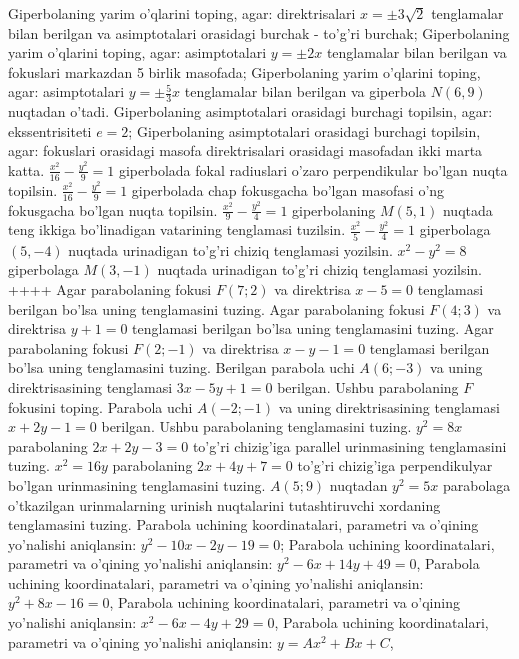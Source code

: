 Giperbolaning yarim o'qlarini toping, agar: direktrisalari $x= \pm 3 \sqrt{2}$ tenglamalar bilan berilgan va asimptotalari orasidagi burchak - to'g'ri burchak;
Giperbolaning yarim o'qlarini toping, agar: asimptotalari $y= \pm 2 x$ tenglamalar bilan berilgan va fokuslari markazdan 5 birlik masofada;
Giperbolaning yarim o'qlarini toping, agar: asimptotalari $y= \pm \frac{5}{3} x$ tenglamalar bilan berilgan va giperbola $N(6,9)$ nuqtadan o'tadi.
Giperbolaning asimptotalari orasidagi burchagi topilsin, agar: ekssentrisiteti $e=2$;
Giperbolaning asimptotalari orasidagi burchagi topilsin, agar: fokuslari orasidagi masofa direktrisalari orasidagi masofadan ikki marta katta.
$\frac{x^2}{16}-\frac{y^2}{9}=1$ giperbolada fokal radiuslari o'zaro perpendikular bo'lgan nuqta topilsin.
$\frac{x^2}{16}-\frac{y^2}{9}=1$ giperbolada chap fokusgacha bo'lgan masofasi o'ng fokusgacha bo'lgan nuqta topilsin.
$\frac{x^2}{9}-\frac{y^2}{4}=1$ giperbolaning $M(5,1)$ nuqtada teng ikkiga bo'linadigan vatarining tenglamasi tuzilsin.
$\frac{x^2}{5}-\frac{y^2}{4}=1$ giperbolaga $(5,-4)$ nuqtada urinadigan to'g'ri chiziq tenglamasi yozilsin.
$x^2-y^2=8$ giperbolaga $M(3,-1)$ nuqtada urinadigan to'g'ri chiziq tenglamasi yozilsin.
++++
Agar parabolaning fokusi $F (7; 2) $ va direktrisa $x-5=0$ tenglamasi berilgan bo'lsa uning tenglamasini tuzing.
Agar parabolaning fokusi $F (4;3) $ va direktrisa $y+1=0$ tenglamasi berilgan bo'lsa uning tenglamasini tuzing.
Agar parabolaning fokusi $F(2;-1) $ va direktrisa $x-y-1=0$ tenglamasi berilgan bo'lsa uning tenglamasini tuzing.
Berilgan parabola uchi $A(6;-3)$ va uning direktrisasining tenglamasi $3x-5y+1=0$ berilgan. Ushbu parabolaning $F$ fokusini toping.
Parabola uchi $A(-2;-1)$ va uning direktrisasining tenglamasi $x+2y-1=0$ berilgan. Ushbu parabolaning tenglamasini tuzing.
$y^2=8x$ parabolaning $2x+2y-3=0$ to'g'ri chizig'iga parallel urinmasining tenglamasini tuzing.
$x^2=16y$ parabolaning $2x+4y+7=0$ to'g'ri chizig'iga perpendikulyar bo'lgan urinmasining tenglamasini tuzing.
$A(5;9)$ nuqtadan $y^2=5x$ parabolaga o'tkazilgan urinmalarning urinish nuqtalarini tutashtiruvchi xordaning tenglamasini tuzing.
Parabola uchining koordinatalari, parametri va o'qining yo'nalishi aniqlansin: $y^2-10 x-2 y-19=0$;
Parabola uchining koordinatalari, parametri va o'qining yo'nalishi aniqlansin: $y^2-6 x+14 y+49=0$,
Parabola uchining koordinatalari, parametri va o'qining yo'nalishi aniqlansin: $y^2+8 x-16=0$,
Parabola uchining koordinatalari, parametri va o'qining yo'nalishi aniqlansin: $x^2-6 x-4 y+29=0$,
Parabola uchining koordinatalari, parametri va o'qining yo'nalishi aniqlansin: $y=A x^2+B x+C$,
